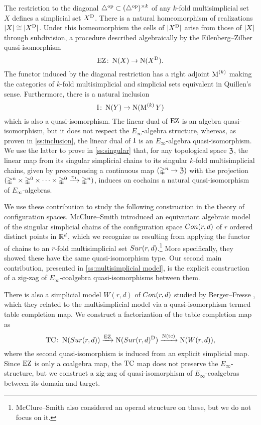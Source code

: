 The restriction to the diagonal $\triangle^{\mathrm{op}} \subset (\triangle^{\mathrm{op}})^{\times k}$ of any $k$-fold multisimplicial set $X$ defines a simplicial set $X^{\mathrm{D}}$.
There is a natural homeomorphism of realizations $\lvert X\rvert \cong \lvert X^{\mathrm{D}}\rvert$.
Under this homeomorphism the cells of $\lvert X^{\mathrm{D}}\rvert$ arise from those of $\lvert X\rvert$ through subdivision, a procedure described algebraically by the Eilenberg--Zilber quasi-isomorphism
\[
\operatorname{EZ} \colon \operatorname{N}(X) \to \operatorname{N}(X^{\mathrm{D}}).
\]
The functor induced by the diagonal restriction has a right adjoint $\operatorname{M}^{(k)}$ making the categories of $k$-fold multisimplicial and simplicial sets equivalent in Quillen's sense.
Furthermore, there is a natural inclusion
\[
\operatorname{I} \colon \operatorname{N}(Y) \to \operatorname{N}(\operatorname{M}^{(k)} Y)
\]
which is also a quasi-isomorphism.
The linear dual of $\operatorname{EZ}$ is an algebra quasi-isomorphism, but it does not respect the $E_\infty$-algebra structure, whereas, as proven in \cref{ss:inclusion}, the linear dual of $\operatorname{I}$ is an $E_\infty$-algebra quasi-isomorphism.
We use the latter to prove in \cref{ss:singular} that, for any topological space $\mathfrak{Z}$, the linear map from its singular simplicial chains to its singular $k$-fold multisimplicial chains, given by precomposing a continuous map $(\mathbb{\Delta}^n \to \mathfrak{Z})$ with the projection $(\mathbb{\Delta}^n \times \mathbb{\Delta}^{0}\times\dots\times\mathbb{\Delta}^{0} \xrightarrow{\pi_1} \mathbb{\Delta}^n)$, induces on cochains a natural quasi-isomorphism of $E_\infty$-algebras.

We use these contribution to study the following construction in the theory of configuration spaces.
McClure--Smith \cite{mcclure2003multivariable} introduced an equivariant algebraic model of the singular simplicial chains of the configuration space $Con(r,d)$ of $r$ ordered distinct points in $\mathbb{R}^d$, which we recognize as resulting from applying the functor of chains to an $r$-fold multisimplicial set $Sur(r,d)$.\footnote{McClure--Smith also considered an operad structure on these, but we do not focus on it.}
More specifically, they showed these have the same quasi-isomorphism type.
Our second main contribution, presented in \cref{ss:multisimplicial model}, is the explicit construction of a zig-zag of $E_\infty$-coalgebra quasi-isomorphisms between them.

There is also a simplicial model $W(r,d)$ of $Con(r,d)$ studied by Berger--Fresse \cite{berger2004combinatorial}, which they related to the multisimplicial model via a quasi-isomorphism termed table completion map.
We construct a factorization of the table completion map as
\[
\mathrm{TC} \colon
\operatorname{N}(Sur(r,d))
\xrightarrow{\operatorname{EZ}}
\operatorname{N}(Sur(r,d)^{\mathrm{D}})
\xrightarrow{\operatorname{N}(\mathrm{tc})}
\operatorname{N}(W(r,d)),
\]
where the second quasi-isomorphism is induced from an explicit simplicial map.
Since $\operatorname{EZ}$ is only a coalgebra map, the $\mathrm{TC}$ map does not preserve the $E_\infty$-structure, but we construct a zig-zag of quasi-isomorphism of $E_\infty$-coalgebras between its domain and target.
